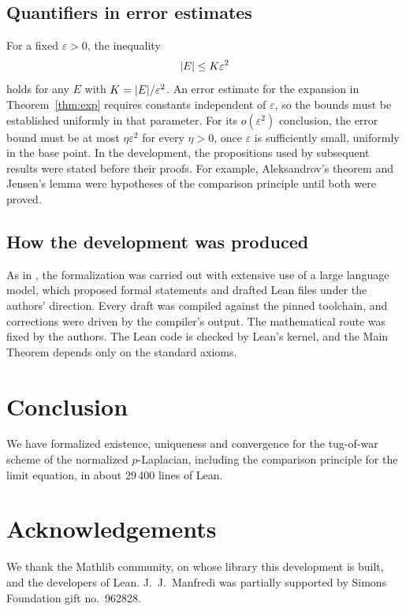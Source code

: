 \documentclass[11pt,reqno]{amsart}
\newcommand{\eps}{\varepsilon}
\DeclarePairedDelimiter{\abs}{\lvert}{\rvert}
\theoremstyle{plain}
\theoremstyle{definition}
\theoremstyle{remark}
\begin{document}
\subsection{Quantifiers in error estimates}
For a fixed $\eps>0$, the inequality
\[
  \abs E\le K\eps^2
\]
holds for any $E$ with $K=\abs E/\eps^2$. An error estimate for the expansion
in Theorem~\ref{thm:exp} requires constants independent of $\eps$, so the
bounds must be established uniformly in that parameter. For its
$o(\eps^2)$ conclusion, the error bound must be at most $\eta\eps^2$ for
every $\eta>0$, once $\eps$ is sufficiently small, uniformly in the base
point. In the development,
the propositions used by subsequent results were stated before their proofs.
For example, Aleksandrov's theorem and Jensen's lemma were hypotheses of the
comparison principle until both were proved.

\subsection{How the development was produced}
As in \cite{AK26}, the formalization was carried out with extensive use of a
large language model, which proposed formal statements and drafted Lean files
under the authors' direction. Every draft was compiled against the pinned
toolchain, and corrections were driven by the compiler's output. The
mathematical route was fixed by the authors. The Lean code is checked by
Lean's kernel, and the Main Theorem depends only on the standard axioms.

\section{Conclusion}\label{sec:conclusion}

We have formalized existence, uniqueness and convergence for the tug-of-war
scheme of the normalized $p$-Laplacian, including the comparison principle for
the limit equation, in about 29\,400 lines of Lean.

\section*{Acknowledgements}
We thank the Mathlib community, on whose library this development is built,
and the developers of Lean. J.~J.~Manfredi was partially supported by Simons
Foundation gift no.~962828.



\end{document}
